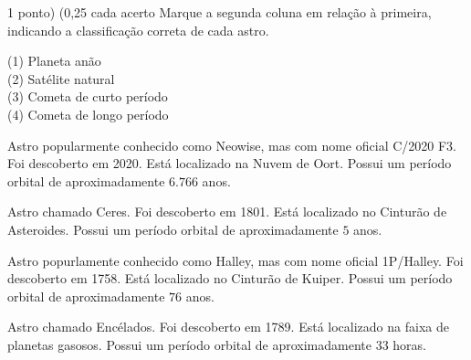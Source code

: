 \documentclass{../lista}
\begin{document}
	\begin{questao}{1 ponto) (0,25 cada acerto}
		Marque a segunda coluna em relação à primeira, indicando a classificação correta de cada astro.
		\begin{multicols}{2}
			\vfill\null \vfill\null
			\begin{flushleft}
				(1) Planeta anão \\
				(2) Satélite natural \\
				(3) Cometa de curto período \\
				(4) Cometa de longo período
			\end{flushleft}
			\vfill\null \vfill\null
			\columnbreak
			\begin{alternativas}
				\item Astro popularmente conhecido como Neowise, mas com nome oficial C/2020 F3. Foi descoberto em 2020. Está localizado na Nuvem de Oort. Possui um período orbital de aproximadamente $6.766$ anos.
				\item Astro chamado Ceres. Foi descoberto em 1801. Está localizado no Cinturão de Asteroides. Possui um período orbital de aproximadamente $5$ anos.
				\item Astro popurlamente conhecido como Halley, mas com nome oficial 1P/Halley. Foi descoberto em 1758. Está localizado no Cinturão de Kuiper. Possui um período orbital de aproximadamente $76$ anos.
				\item Astro chamado Encélados. Foi descoberto em 1789. Está localizado na faixa de planetas gasosos. Possui um período orbital de aproximadamente 33 horas.
			\end{alternativas}
		\end{multicols}
	\end{questao}
\end{document}
